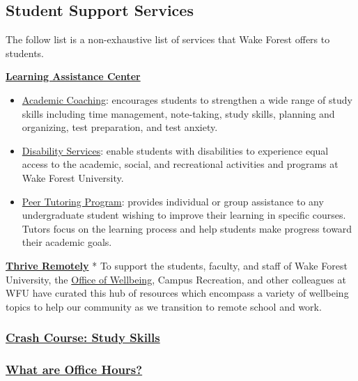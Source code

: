 \hypertarget{student-support-services}{%
\subsection{Student Support Services}\label{student-support-services}}

The follow list is a non-exhaustive list of services that Wake Forest offers to students.

\textbf{\href{https://class.wfu.edu/}{Learning Assistance Center}}

\begin{itemize}
\item
  \href{https://class.wfu.edu/}{Academic Coaching}: encourages students to strengthen a wide range of study skills including time management, note-taking, study skills, planning and organizing, test preparation, and test anxiety.
\item
  \href{https://class.wfu.edu/}{Disability Services}: enable students with disabilities to experience equal access to the academic, social, and recreational activities and programs at Wake Forest University.
\item
  \href{https://class.wfu.edu/}{Peer Tutoring Program}: provides individual or group assistance to any undergraduate student wishing to improve their learning in specific courses. Tutors focus on the learning process and help students make progress toward their academic goals.
\end{itemize}

\textbf{\href{https://thrive.wfu.edu/thrive-remotely-2/}{Thrive Remotely}}
* To support the students, faculty, and staff of Wake Forest University, the \href{https://thrive.wfu.edu/}{Office of Wellbeing}, Campus Recreation, and other colleagues at WFU have curated this hub of resources which encompass a variety of wellbeing topics to help our community as we transition to remote school and work.

\hypertarget{crash-course-study-skills}{%
\subsubsection{\texorpdfstring{\href{https://www.youtube.com/watch?v=E7CwqNHn_Ns\&list=PL8dPuuaLjXtNcAJRf3bE1IJU6nMfHj86W}{Crash Course: Study Skills}}{Crash Course: Study Skills}}\label{crash-course-study-skills}}

\hypertarget{what-are-office-hours}{%
\subsubsection{\texorpdfstring{\href{https://vimeo.com/270014784?embedded=true\&source=vimeo_logo\&owner=2248721}{What are Office Hours?}}{What are Office Hours?}}\label{what-are-office-hours}}

